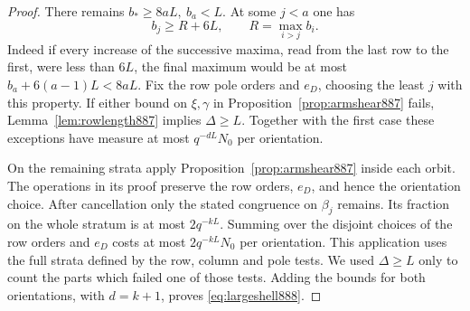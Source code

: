 \documentclass[a4paper,11pt]{article}
\theoremstyle{definition}
\theoremstyle{remark}
\numberwithin{equation}{section}
\begin{document}
\begin{proof}
There remains \(b_*\ge8aL,\ b_a<L\). At some \(j<a\) one has
\[
             b_j\ge R+6L,\qquad R=\max_{i>j} b_i .
\]
Indeed if every increase of the successive maxima, read from
the last row to the first, were less than \(6L\), the final
maximum would be at most \(b_a+6(a-1)L<8aL\).
Fix the row pole orders and \(e_D\), choosing the least \(j\)
with this property. If either bound on \(\xi,\gamma\) in
Proposition~\ref{prop:armshear887} fails, Lemma~\ref{lem:rowlength887}
implies \(\Delta\ge L\). Together with the first case these
exceptions have measure at most \(q^{-dL}N_0\) per orientation.

On the remaining strata apply Proposition~\ref{prop:armshear887}
inside each orbit. The operations in its proof preserve the row
orders, \(e_D\), and hence the orientation choice. After cancellation
only the stated congruence on \(\beta_j\) remains. Its fraction on
the whole stratum is at most \(2q^{-kL}\). Summing over the
disjoint choices of the row orders and \(e_D\) costs at most
\(2q^{-kL}N_0\) per orientation. This application uses the full
strata defined by the row, column and pole tests. We used
\(\Delta\ge L\) only to count the parts which failed one of
those tests. Adding the bounds for both orientations, with
\(d=k+1\), proves \eqref{eq:largeshell888}.
\end{proof}
\end{document}
